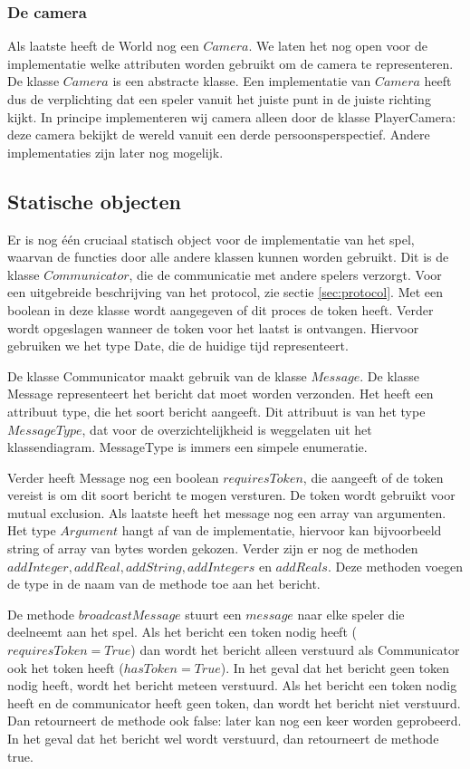 \documentclass[a4paper,11pt]{article}
\newcommand{\protoref}{sectie \ref{sec:protocol}}
\begin{document}
\subsubsection{De camera}
Als laatste heeft de World nog een $Camera$. We laten het nog open voor de implementatie welke attributen worden gebruikt om de camera te representeren. De klasse $Camera$ is een abstracte klasse. Een implementatie van $Camera$ heeft dus de verplichting dat een speler vanuit het juiste punt in de juiste richting kijkt. In principe implementeren wij camera alleen door de klasse PlayerCamera: deze camera bekijkt de wereld vanuit een derde persoonsperspectief. Andere implementaties zijn later nog mogelijk.

\subsection{Statische objecten}
Er is nog \'e\'en cruciaal statisch object voor de implementatie van het spel, waarvan de functies door alle andere klassen kunnen worden gebruikt. Dit is de klasse $Communicator$, die de communicatie met andere spelers verzorgt.  Voor een uitgebreide beschrijving van het protocol, zie \protoref. Met een boolean in deze klasse wordt aangegeven of dit proces de token heeft. Verder wordt opgeslagen wanneer de token voor het laatst is ontvangen. Hiervoor gebruiken we het type Date, die de huidige tijd representeert.

De klasse Communicator maakt gebruik van de klasse $Message$. De klasse Message representeert het bericht dat moet worden verzonden. Het heeft een attribuut type, die het soort bericht aangeeft. Dit attribuut is van het type $MessageType$, dat voor de overzichtelijkheid is weggelaten uit het klassendiagram. MessageType is immers een simpele enumeratie.

Verder heeft Message nog een boolean $requiresToken$, die aangeeft of de token vereist is om dit soort bericht te mogen versturen. De token wordt gebruikt voor mutual exclusion. Als laatste heeft het message nog een array van argumenten. Het type $Argument$ hangt af van de implementatie, hiervoor kan bijvoorbeeld string of array van bytes worden gekozen. Verder zijn er nog de methoden $addInteger, addReal, addString, addIntegers$ en $addReals$. Deze methoden voegen de type in de naam van de methode toe aan het bericht.

De methode $broadcastMessage$ stuurt een $message$ naar elke speler die deelneemt aan het spel. Als het bericht een token nodig heeft ($requiresToken = True$) dan wordt het bericht alleen verstuurd als Communicator ook het token heeft ($hasToken = True$). In het geval dat het bericht geen token nodig heeft, wordt het bericht meteen verstuurd. Als het bericht een token nodig heeft en de communicator heeft geen token, dan wordt het bericht niet verstuurd. Dan retourneert de methode ook false: later kan nog een keer worden geprobeerd. In het geval dat het bericht wel wordt verstuurd, dan retourneert de methode true.
\end{document}
